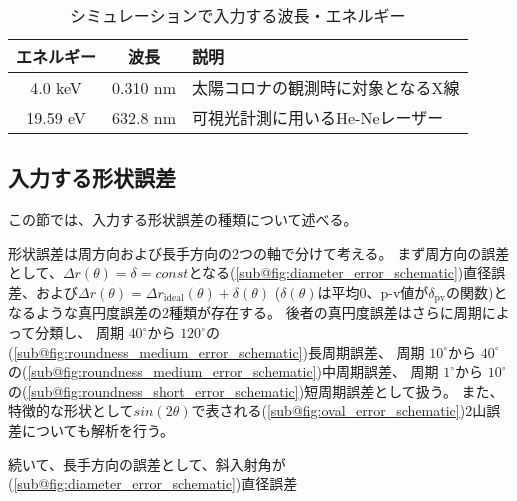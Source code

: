 \begin{table}[!ht]
\begin{center}
  \caption{シミュレーションで入力する波長・エネルギー}
  \begin{tabular}{|c|c|l|} \hline
    エネルギー & 波長 & 説明 \\ \hline
    4.0 keV & 0.310 nm & 太陽コロナの観測時に対象となるX線 \\
    19.59 eV & 632.8 nm & 可視光計測に用いるHe-Neレーザー \\ \hline
  \end{tabular}
  \label{tb:simulation_target_energy}
\end{center}
\end{table}

\subsection{入力する形状誤差}
\label{chap2_error_input_types}

この節では、入力する形状誤差の種類について述べる。

形状誤差は周方向および長手方向の2つの軸で分けて考える。
まず周方向の誤差として、$\Delta r(\theta)=\delta=const$となる(\ref{sub@fig:diameter_error_schematic})直径誤差、および$\Delta r(\theta)=\Delta r_{\mathrm{ideal}}(\theta) + \delta(\theta)$ ($\delta(\theta)$は平均$0$、p-v値が$\delta_{\mathrm{pv}}$の関数)となるような真円度誤差の2種類が存在する。
後者の真円度誤差はさらに周期によって分類し、
周期 $40^\circ$から $120^\circ$の(\ref{sub@fig:roundness_medium_error_schematic})長周期誤差、
周期 $10^\circ$から $40^\circ$の(\ref{sub@fig:roundness_medium_error_schematic})中周期誤差、
周期 $1^\circ$から $10^\circ$の(\ref{sub@fig:roundness_short_error_schematic})短周期誤差として扱う。
また、特徴的な形状として$sin(2\theta)$で表される(\ref{sub@fig:oval_error_schematic})2山誤差についても解析を行う。

続いて、長手方向の誤差として、斜入射角が(\ref{sub@fig:diameter_error_schematic})直径誤差

